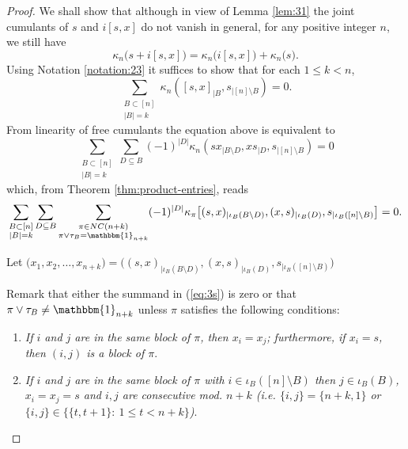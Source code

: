 \documentclass{amsart}
\begin{document}
 \begin{proof}
 
 We shall show that although in view of Lemma \ref{lem:31} the joint cumulants of $s$ and $i[s,x]$ do not vanish in general, for any positive integer $ n $, we still have
 \begin{equation*}
 \kappa_n\big( s + i[s, x] \big) = \kappa_n \big( i[s, x]\big) + \kappa_n \big(s\big).
 \end{equation*}	
Using Notation \ref{notation:23} it suffices to show that for each $ 1 \leq k < n $, 
\begin{equation}
\sum_{\substack{B \subset [n] \\ | B | = k}}
\kappa_n( [s, x]_{| B }, s_{| [n]\setminus B })=0.
\end{equation}
 From linearity of free cumulants the equation above is equivalent to
 \begin{equation}\label{kAB}
 \sum_{\substack{B \subset [n] \\ | B | = k}} 
 \sum_{D \subseteq B } 
 (-1)^{|D|}\kappa_n( sx_{| B \setminus D}, xs_{|D}, s_{| [n]\setminus B  })=0
 \end{equation}	
 which, from Theorem \ref{thm:product-entries}, reads
 \begin{equation}\label{eq:3s}
  \sum_{\substack{B \subset [n] \\ | B | = k}} 
 \sum_{D \subseteq B }
 \sum_{\substack{\pi \in NC(n+k) \\ \pi \vee \tau_B = \mathbbm{1}_{n+k} } } 
 (-1)^{| D|}
 \kappa_{\pi} \big[ 
 (s, x)_{ | \iota_B (B \setminus D)} , (x, s)_{| \iota_B (D)} , s_{| \iota_B ([n] \setminus B )}\big] = 0.
 \end{equation}
 
 Let 
 $\big(x_1, x_2, \dots, x_{n+k}\big) = 
 \big(
 (s, x)_{ | \iota_B (B \setminus D)} , (x, s)_{| \iota_B (D)} , s_{| \iota_B ([n] \setminus B )}\big) $
 
 
 Remark that either the summand in (\ref{eq:3s}) is zero or 
 that  $ \pi \vee \tau_B \neq \mathbbm{1}_{n+k}  $
unless $ \pi $ satisfies the following conditions:
\begin{enumerate}
	\item[(i)] \textit{If $ i $ and $j $ are in the same block of $ \pi $, then $ x_i = x_j $; furthermore, if $ x_i =s $, then $ (i, j) $ is a block of $\pi $}.
	\item[(ii)] \emph{If $ i $ and $ j $ are in the same block of $ \pi $ with $ i \in \iota_B([n]\setminus B ) $ 
	then $ j \in \iota_B(B)$, $ x_i = x_j= s $ and 
	$ i, j$ are consecutive mod. $n+k$ (i.e. $\{i, j\} = \{ n+k, 1\} $ or $ \{i, j\} \in \big\{ \{ t, t+1\}: \ 1 \leq t < n+k \big\} $)}.
\end{enumerate}


\end{proof}
\end{document}
